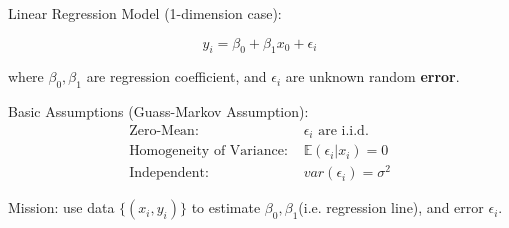 \begin{point}
    Linear Regression Model (1-dimension case):
\end{point}

    \begin{equation}
        y_i=\beta_0+\beta_1x_0+\epsilon_i    
    \end{equation}

    where $\beta_0,\beta_1$ are regression coefficient, and $\epsilon_i$ are unknown random \textbf{error}. 
    
    Basic Assumptions (Guass-Markov Assumption):
    \begin{align*}
        \text{Zero-Mean: }&\epsilon_i\text{ are i.i.d.}\\
        \text{Homogeneity of Variance: }&\mathbb{E}(\epsilon_i|x_i)=0\\
        \text{Independent: }&var(\epsilon_i)=\sigma^2
    \end{align*}

    Mission: use data $\{(x_i,y_i)\}$ to estimate $\beta_0,\beta_1$(i.e. regression line), and error $\epsilon_i$.


